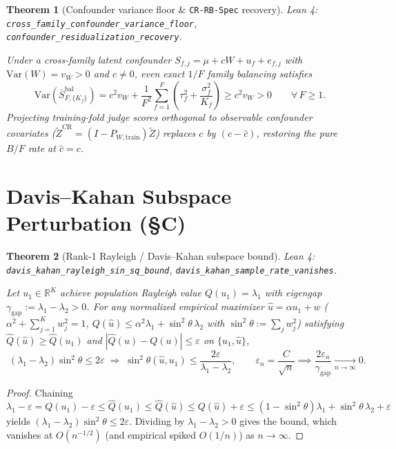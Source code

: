 \documentclass[11pt]{article}
\theoremstyle{plain}
\newtheorem{theorem}{Theorem}[section]
\theoremstyle{remark}
\newcommand{\Var}{\mathrm{Var}}
\newcommand{\R}{\mathbb{R}}
\newcommand{\lident}[1]{{\small\texttt{#1}}}
\begin{document}
\begin{theorem}[Confounder variance floor \& \texttt{CR-RB-Spec} recovery]
\noindent\textit{Lean 4:} \lident{cross\_\allowbreak family\_\allowbreak confounder\_\allowbreak variance\_\allowbreak floor},
\lident{confounder\_\allowbreak residualization\_\allowbreak recovery}.\par\medskip
Under a cross-family latent confounder $S_{f,j} = \mu + cW + u_f + e_{f,j}$ with
$\Var(W) = v_W > 0$ and $c \neq 0$, even exact $1/F$ family balancing satisfies
\begin{equation}
\boxed{\;
\Var\!\left(\bar{S}^{\mathrm{bal}}_{F,\{K_f\}}\right)
= c^2 v_W + \frac{1}{F^2}\sum_{f=1}^F \left(\tau_f^2 + \frac{\sigma_f^2}{K_f}\right)
\ge c^2 v_W > 0 \qquad \forall\, F \ge 1.\;}
\end{equation}
Projecting training-fold judge scores orthogonal to observable confounder covariates
($\widetilde{Z}^{\mathrm{CR}} = (I - P_{W,\mathrm{train}})\widetilde{Z}$) replaces $c$ by
$(c - \hat{c})$, restoring the pure $B/F$ rate at $\hat{c} = c$.
\end{theorem}

\section{Davis--Kahan Subspace Perturbation (\S C)}

\begin{theorem}[Rank-1 Rayleigh / Davis--Kahan subspace bound]
\noindent\textit{Lean 4:} \lident{davis\_\allowbreak kahan\_\allowbreak rayleigh\_\allowbreak sin\_\allowbreak sq\_\allowbreak bound},
\lident{davis\_\allowbreak kahan\_\allowbreak sample\_\allowbreak rate\_\allowbreak vanishes}.\par\medskip
Let $u_1 \in \R^K$ achieve population Rayleigh value $Q(u_1) = \lambda_1$ with eigengap
$\gamma_{\mathrm{gap}} := \lambda_1 - \lambda_2 > 0$. For any normalized empirical maximizer
$\hat{u} = \alpha u_1 + w$ ($\alpha^2 + \sum_{j=1}^K w_j^2 = 1$, $Q(\hat{u}) \le \alpha^2\lambda_1 + \sin^2\theta\,\lambda_2$
with $\sin^2\theta := \sum_j w_j^2$) satisfying $\widehat{Q}(\hat{u}) \ge \widehat{Q}(u_1)$
and $|\widehat{Q}(u) - Q(u)| \le \varepsilon$ on $\{u_1, \hat{u}\}$,
\begin{equation}
\boxed{\;
(\lambda_1 - \lambda_2)\sin^2\theta \le 2\varepsilon
\;\Longrightarrow\;
\sin^2\theta(\hat{u}, u_1) \le \frac{2\varepsilon}{\lambda_1 - \lambda_2},
\qquad \varepsilon_n = \frac{C}{\sqrt{n}} \implies \frac{2\varepsilon_n}{\gamma_{\mathrm{gap}}} \xrightarrow[n\to\infty]{} 0.\;}
\end{equation}
\end{theorem}
\begin{proof}
Chaining $\lambda_1 - \varepsilon = Q(u_1) - \varepsilon \le \widehat{Q}(u_1) \le \widehat{Q}(\hat{u}) \le Q(\hat{u}) + \varepsilon \le (1-\sin^2\theta)\lambda_1 + \sin^2\theta\,\lambda_2 + \varepsilon$ yields $(\lambda_1 - \lambda_2)\sin^2\theta \le 2\varepsilon$. Dividing by $\lambda_1 - \lambda_2 > 0$ gives the bound, which vanishes at $O(n^{-1/2})$ (and empirical spiked $O(1/n)$) as $n \to \infty$.
\end{proof}
\end{document}

